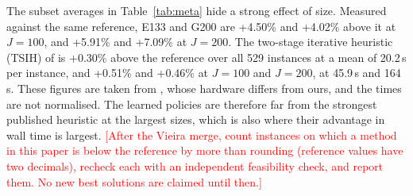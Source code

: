 \documentclass[preprint,12pt,authoryear]{elsarticle}
\newcommand{\placeholder}[1]{\textcolor{red}{[#1]}}
\begin{document}
The subset averages in Table~\ref{tab:meta} hide a strong effect of size. Measured against the same reference, E133 and G200 are +4.50\% and +4.02\% above it at $J = 100$, and +5.91\% and +7.09\% at $J = 200$. The two-stage iterative heuristic (TSIH) of \citet{li2025} is +0.30\% above the reference over all 529 instances at a mean of 20.2\,s per instance, and +0.51\% and +0.46\% at $J = 100$ and $J = 200$, at 45.9\,s and 164\,s. These figures are taken from \citet{li2025}, whose hardware differs from ours, and the times are not normalised. The learned policies are therefore far from the strongest published heuristic at the largest sizes, which is also where their advantage in wall time is largest. \placeholder{After the Vieira merge, count instances on which a method in this paper is below the reference by more than rounding (reference values have two decimals), recheck each with an independent feasibility check, and report them. No new best solutions are claimed until then.}
\end{document}
